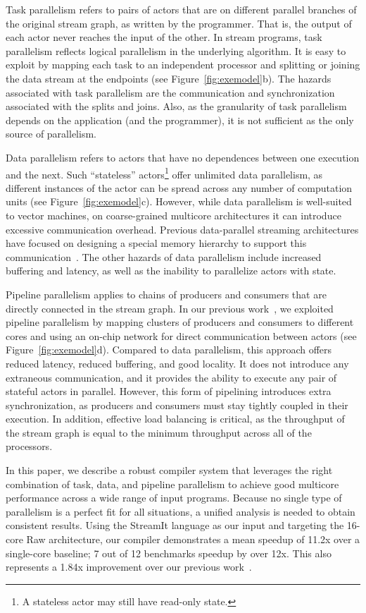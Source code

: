 Task parallelism refers to pairs of actors that are on different
parallel branches of the original stream graph, as written by the
programmer.  That is, the output of each actor never reaches the input
of the other.  In stream programs, task parallelism reflects logical
parallelism in the underlying algorithm.  It is easy to exploit by
mapping each task to an independent processor and splitting or joining
the data stream at the endpoints (see Figure~\ref{fig:exemodel}b).
The hazards associated with task parallelism are the communication and
synchronization associated with the splits and joins.  Also, as the
granularity of task parallelism depends on the application (and the
programmer), it is not sufficient as the only source of parallelism.

Data parallelism refers to actors that have no dependences between one
execution and the next.  Such ``stateless'' actors\footnote{A
stateless actor may still have read-only state.}  offer unlimited data
parallelism, as different instances of the actor can be spread across
any number of computation units (see Figure~\ref{fig:exemodel}c).
However, while data parallelism is well-suited to vector machines, on
coarse-grained multicore architectures it can introduce excessive
communication overhead.  Previous data-parallel streaming
architectures have focused on designing a special memory hierarchy to
support this communication~\cite{imagine-ieee}.  The other hazards of data
parallelism include increased buffering and latency, as well as the
inability to parallelize actors with state.

Pipeline parallelism applies to chains of producers and consumers that
are directly connected in the stream graph.  In our previous
work~\cite{streamit-asplos}, we exploited pipeline parallelism by
mapping clusters of producers and consumers to different cores and
using an on-chip network for direct communication between actors (see
Figure~\ref{fig:exemodel}d).  Compared to data parallelism, this
approach offers reduced latency, reduced buffering, and good locality.
It does not introduce any extraneous communication, and it provides
the ability to execute any pair of stateful actors in parallel.
However, this form of pipelining introduces extra synchronization, as
producers and consumers must stay tightly coupled in their execution.
In addition, effective load balancing is critical, as the throughput
of the stream graph is equal to the minimum throughput across all of
the processors.

In this paper, we describe a robust compiler system that leverages the
right combination of task, data, and pipeline parallelism to achieve
good multicore performance across a wide range of input programs.
Because no single type of parallelism is a perfect fit for all
situations, a unified analysis is needed to obtain consistent results.
Using the StreamIt language as our input and targeting the 16-core Raw
architecture, our compiler demonstrates a mean speedup of 11.2x over a
single-core baseline; 7 out of 12 benchmarks speedup by over 12x.
This also represents a 1.84x improvement over our previous
work~\cite{streamit-asplos}.

